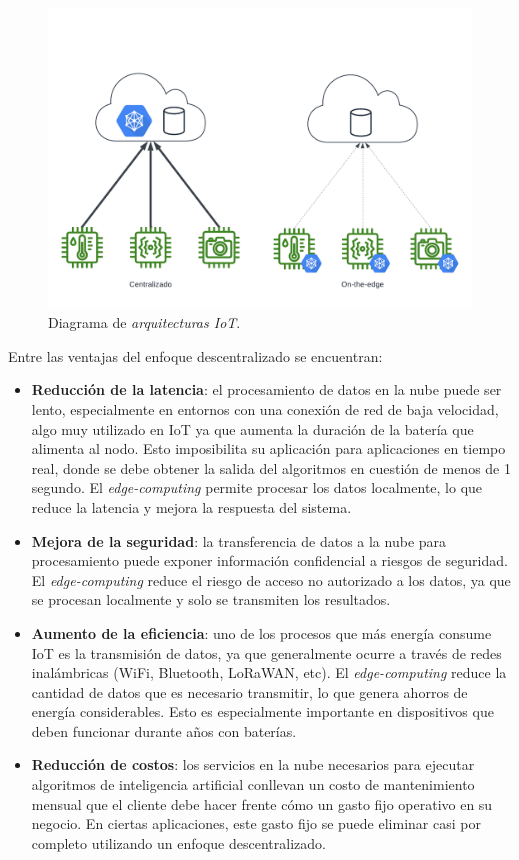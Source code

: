\documentclass[
11pt, %
codirector, %
]{charter}
\begin{document}
\begin{figure}[htpb]
\centering 
\includegraphics[height=.3\textheight]{./Figuras/EdgeVsCentralizedAI.png}
\caption{Diagrama de \textit{arquitecturas IoT}.}
\label{fig:EdgeVsCent}
\end{figure}

Entre las ventajas del enfoque descentralizado se encuentran:
\begin{itemize}
\item \textbf{Reducción de la latencia}: el procesamiento de datos en la nube puede ser lento, especialmente en entornos con una conexión de red de baja velocidad, algo muy utilizado en IoT ya que aumenta la duración de la batería que alimenta al nodo. Esto imposibilita su aplicación para aplicaciones en tiempo real, donde se debe obtener la salida del algoritmos en cuestión de menos de 1 segundo. El \textit{edge-computing} permite procesar los datos localmente, lo que reduce la latencia y mejora la respuesta del sistema.
\item \textbf{Mejora de la seguridad}: la transferencia de datos a la nube para procesamiento puede exponer información confidencial a riesgos de seguridad. El \textit{edge-computing} reduce el riesgo de acceso no autorizado a los datos, ya que se procesan localmente y solo se transmiten los resultados.
\item \textbf{Aumento de la eficiencia}: uno de los procesos que más energía consume IoT es la transmisión de datos, ya que generalmente ocurre a través de redes inalámbricas (WiFi, Bluetooth, LoRaWAN, etc). El \textit{edge-computing} reduce la cantidad de datos que es necesario transmitir, lo que genera ahorros de energía considerables. Esto es especialmente importante en dispositivos que deben funcionar durante años con baterías.
\item \textbf{Reducción de costos}: los servicios en la nube necesarios para ejecutar algoritmos de inteligencia artificial conllevan un costo de mantenimiento mensual que el cliente debe hacer frente cómo un gasto fijo operativo en su negocio. En ciertas aplicaciones, este gasto fijo se puede eliminar casi por completo utilizando un enfoque descentralizado. 
\end{itemize}
\end{document}
